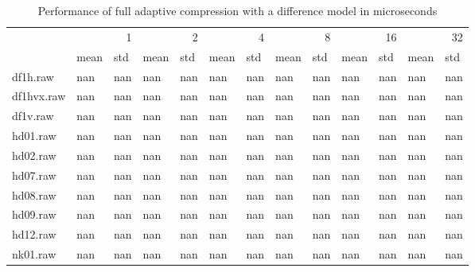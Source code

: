 \begin{table}
\caption{Performance of full adaptive compression with a difference model in microseconds}
\begin{tabular}{lllllllllllll}
 & \multicolumn{2}{r}{1} & \multicolumn{2}{r}{2} & \multicolumn{2}{r}{4} & \multicolumn{2}{r}{8} & \multicolumn{2}{r}{16} & \multicolumn{2}{r}{32} \\
 & mean & std & mean & std & mean & std & mean & std & mean & std & mean & std \\
df1h.raw & nan & nan & nan & nan & nan & nan & nan & nan & nan & nan & nan & nan \\
df1hvx.raw & nan & nan & nan & nan & nan & nan & nan & nan & nan & nan & nan & nan \\
df1v.raw & nan & nan & nan & nan & nan & nan & nan & nan & nan & nan & nan & nan \\
hd01.raw & nan & nan & nan & nan & nan & nan & nan & nan & nan & nan & nan & nan \\
hd02.raw & nan & nan & nan & nan & nan & nan & nan & nan & nan & nan & nan & nan \\
hd07.raw & nan & nan & nan & nan & nan & nan & nan & nan & nan & nan & nan & nan \\
hd08.raw & nan & nan & nan & nan & nan & nan & nan & nan & nan & nan & nan & nan \\
hd09.raw & nan & nan & nan & nan & nan & nan & nan & nan & nan & nan & nan & nan \\
hd12.raw & nan & nan & nan & nan & nan & nan & nan & nan & nan & nan & nan & nan \\
nk01.raw & nan & nan & nan & nan & nan & nan & nan & nan & nan & nan & nan & nan \\
\end{tabular}
\end{table}
